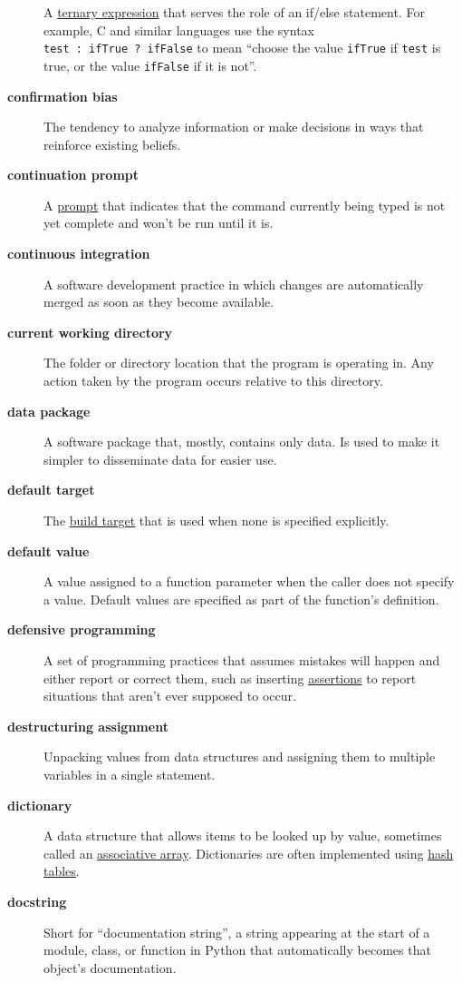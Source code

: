 \documentclass[
]{krantz}
\begin{document}
\begin{description}
A \protect\hyperlink{ternary_expression}{ternary expression} that serves the role of an if/else statement. For example, C and similar languages use the syntax \texttt{test\ :\ ifTrue\ ?\ ifFalse} to mean ``choose the value \texttt{ifTrue} if \texttt{test} is true, or the value \texttt{ifFalse} if it is not''.
\item[\textbf{confirmation bias}]
The tendency to analyze information or make decisions in ways that reinforce existing beliefs.
\item[\textbf{continuation prompt}]
A \protect\hyperlink{prompt}{prompt} that indicates that the command currently being typed is not yet complete and won't be run until it is.
\item[\textbf{continuous integration}]
A software development practice in which changes are automatically merged as soon as they become available.
\item[\textbf{current working directory}]
The folder or directory location that the program is operating in. Any action taken by the program occurs relative to this directory.
\item[\textbf{data package}]
A software package that, mostly, contains only data. Is used to make it simpler to disseminate data for easier use.
\item[\textbf{default target}]
The \protect\hyperlink{build_target}{build target} that is used when none is specified explicitly.
\item[\textbf{default value}]
A value assigned to a function parameter when the caller does not specify a value. Default values are specified as part of the function's definition.
\item[\textbf{defensive programming}]
A set of programming practices that assumes mistakes will happen and either report or correct them, such as inserting \protect\hyperlink{assertion}{assertions} to report situations that aren't ever supposed to occur.
\item[\textbf{destructuring assignment}]
Unpacking values from data structures and assigning them to multiple variables in a single statement.
\item[\textbf{dictionary}]
A data structure that allows items to be looked up by value, sometimes called an \protect\hyperlink{associative_array}{associative array}. Dictionaries are often implemented using \protect\hyperlink{hash_table}{hash tables}.
\item[\textbf{docstring}]
Short for ``documentation string'', a string appearing at the start of a module, class, or function in Python that automatically becomes that object's documentation.

\end{description}
\end{document}
